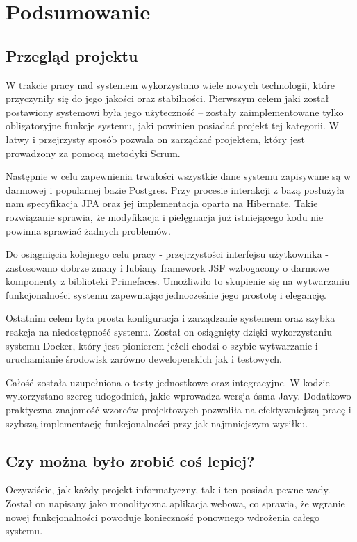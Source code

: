 \chapter{Podsumowanie}

\section{Przegląd projektu}
W trakcie pracy nad systemem wykorzystano wiele nowych technologii, które przyczyniły się do jego jakości oraz stabilności. Pierwszym celem jaki został postawiony systemowi była jego użyteczność -- zostały zaimplementowane tylko obligatoryjne funkcje systemu, jaki powinien posiadać projekt tej kategorii. W łatwy i przejrzysty sposób pozwala on zarządzać projektem, który jest prowadzony za pomocą metodyki Scrum. 

Następnie w celu zapewnienia trwałości wszystkie dane systemu zapisywane są w darmowej i popularnej bazie Postgres. Przy procesie interakcji z bazą posłużyła nam specyfikacja JPA oraz jej implementacja oparta na Hibernate. Takie rozwiązanie sprawia, że modyfikacja i pielęgnacja już istniejącego kodu nie powinna sprawiać żadnych problemów.

Do osiągnięcia kolejnego celu pracy - przejrzystości interfejsu użytkownika - zastosowano dobrze znany i lubiany framework JSF wzbogacony o darmowe komponenty z biblioteki Primefaces. Umożliwiło to skupienie się na wytwarzaniu funkcjonalności systemu zapewniając jednocześnie jego prostotę i elegancję.

Ostatnim celem była prosta konfiguracja i zarządzanie systemem oraz szybka reakcja na niedostępność systemu. Został on osiągnięty dzięki wykorzystaniu systemu Docker, który jest pionierem jeżeli chodzi o szybie wytwarzanie i uruchamianie środowisk zarówno deweloperskich jak i testowych. 

Całość została uzupełniona o testy jednostkowe oraz integracyjne. W kodzie wykorzystano szereg udogodnień, jakie wprowadza wersja ósma Javy. Dodatkowo praktyczna znajomość wzorców projektowych pozwoliła na efektywniejszą pracę i szybszą implementację funkcjonalności przy jak najmniejszym wysiłku.


\section{Czy można było zrobić coś lepiej?}
Oczywiście, jak każdy projekt informatyczny, tak i ten posiada pewne wady. Został on napisany jako monolityczna aplikacja webowa, co sprawia, że wgranie nowej funkcjonalności powoduje konieczność ponownego wdrożenia całego systemu.

